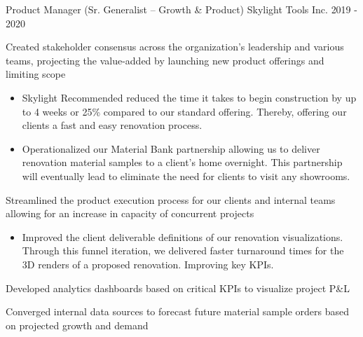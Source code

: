 \begin{cventries}

  \cventry
    {Product Manager (Sr. Generalist – Growth \& Product)} %
    {Skylight Tools Inc.} %
    {} %
    {2019 - 2020} %
    {
    \begin{cvitems} %
        \item {Created stakeholder consensus across the organization’s leadership and various teams, projecting the value-added by launching new product offerings and limiting scope
            \begin{itemize}
                \item {Skylight Recommended reduced the time it takes to begin construction by up to 4 weeks or 25\% compared to our standard offering. Thereby, offering our clients a fast and easy renovation process.}
                \item {Operationalized our Material Bank partnership allowing us to deliver renovation material samples to a client’s home overnight.
                \newline This partnership will eventually lead to eliminate the need for clients to visit any showrooms.}
            \end{itemize}
        \item {Streamlined the product execution process for our clients and internal teams allowing for an increase in capacity of concurrent projects
            \begin{itemize}
                \item {Improved the client deliverable definitions of our renovation visualizations. Through this funnel iteration, we delivered faster turnaround times for the 3D renders of a proposed renovation. Improving key KPIs.}
            \end{itemize}}
        \item {Developed analytics dashboards based on critical KPIs to visualize project P\&L}
        \item {Converged internal data sources to forecast future material sample orders based on projected growth and demand}}

\end{cvitems}}
\end{cventries}
